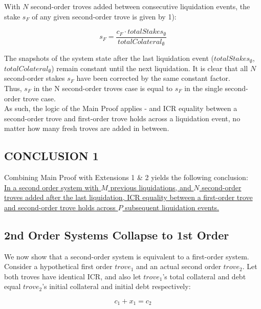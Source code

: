 \documentclass[reqno]{article}
\begin{document}
With $N$ second-order troves added between consecutive liquidation events, the stake $s_F$ of any given second-order trove is given by 1): 

\begin{equation} 
    s_F=\frac{c_F \cdot totalStakes_\emptyset}{totalColateral_\emptyset}
\end{equation}

\bigskip
The snapshots of the system state after the last liquidation event ($totalStakes_\emptyset$, $totalColateral_\emptyset$) remain constant until the next liquidation. It is clear that all $N$ second-order stakes $s_F$ have been corrected by the same constant factor.\\

Thus, $s_F$ in the N second-order troves case is equal to $s_F$ in the single second-order trove case.\\

As such, the logic of the Main Proof applies - and ICR equality between a second-order trove and first-order trove holds across a liquidation event, no matter how many fresh troves are added in between.

\subsection{CONCLUSION 1}

\bigskip
Combining Main Proof with Extensions 1 \& 2 yields the following conclusion:\\

\uline{In a second order system with $M$ previous liquidations, and $N$ second-order troves added after the last liquidation, ICR equality between a first-order trove and second-order trove holds across $P$ subsequent liquidation events.}\\

\subsection{2nd Order Systems Collapse to 1st Order}
We now show that a second-order system is equivalent to a first-order system.\\

Consider a hypothetical first order $trove_1$ and an actual second order $trove_2$. Let both troves have identical ICR, and also let $trove_1$’s total collateral and debt equal $trove_2$’s initial collateral and initial debt respectively:

\begin{equation} 
    c_1+x_1=c_2
\end{equation}
\end{document}
